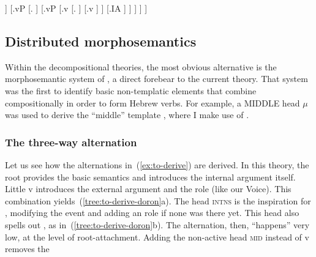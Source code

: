 \begin{exe}
\begin{xlist}
\begin{xlist}
\begin{exe}
\begin{xlist}
\begin{xlist}
\begin{exe}
\begin{xlist}
\begin{xlist}
\begin{exe}
\begin{exe}
\begin{xlist}
\begin{exe}
\begin{exe}
\begin{xlist}
\begin{exe}
\begin{exe}
\begin{exe}
\begin{exe}
\begin{exe}
\begin{xlist}
\begin{exe}
\begin{xlist}
\begin{exe}
\begin{exe}
\begin{xlist}
\begin{exe}
\begin{xlist}
\begin{exe}
\begin{xlist}
\begin{exe}
\begin{exe}
\begin{exe}
\begin{xlist}
\begin{exe}
\begin{exe}
\begin{exe}
\begin{xlist}
\begin{exe}
\begin{xlist}
\begin{exe}
\begin{xlist}
\begin{exe}
\begin{xlist}
\begin{exe}
\begin{exe}
\begin{exe}
\begin{exe}
\begin{xlist}
\begin{exe}
\begin{xlist}
\begin{exe}
\begin{xlist}
\begin{exe}
\begin{xlist}
\begin{exe}
\begin{xlist}
\begin{exe}
\begin{xlist}
\begin{exe}
\begin{exe}
\begin{exe}
\begin{exe}
\begin{xlist}
\begin{exe}
\begin{xlist}
\begin{exe}
\begin{xlist}
\begin{exe}
\begin{exe}
\begin{xlist}
\begin{exe}
\begin{xlist}
\begin{exe}
\begin{exe}
\begin{exe}
\begin{exe}
\begin{xlist}
\begin{xlist}
\begin{exe}
\begin{xlist}
\begin{exe}
\begin{exe}
\begin{exe}
\begin{xlist}
\begin{exe}
\begin{exe}
\begin{xlist}
\begin{exe}
\begin{exe}
\begin{exe}
\begin{xlist}
\begin{xlist}
\begin{exe}
\begin{xlist}
\begin{exe}
\begin{exe}
\begin{exe}
\begin{exe}
\begin{xlist}
\begin{exe}
\begin{xlist}
\begin{exe}
\begin{xlist}
\begin{exe}
\begin{xlist}
\begin{exe}
\begin{exe}
\begin{exe}
\begin{exe}
\begin{exe}
\begin{exe}
\begin{xlist}
\begin{exe}
\begin{xlist}
\begin{exe}
\begin{xlist}
\begin{exe}
\begin{xlist}
\begin{exe}
\begin{xlist}
\begin{exe}
\begin{xlist}
\begin{exe}
\begin{xlist}
]
						[.vP
							[.{\va} ]
							[.vP
								[.v
									[. ]
									[.v ]
								]
								[.IA ]
							]
						]
					]
				]			
 \z
\z 

	\subsection{Distributed morphosemantics \citep{doron03}} \label{vz:others:ed}
Within the decompositional theories, the most obvious alternative is the morphosemantic system of \cite{doron03}, a direct forebear to the current theory. That system was the first to identify basic non-templatic elements that combine compositionally in order to form Hebrew verbs. For example, a MIDDLE head $\mu$ was used to derive the ``middle'' template {\tnif}, where I make use of {\vz}.

		\subsubsection{The three-way alternation}
Let us see how the alternations in~(\ref{ex:to-derive}) are derived. In this theory, the root provides the basic semantics and introduces the internal argument itself. Little v introduces the external argument and the  role (like our Voice). This combination yields~(\ref{tree:to-derive-doron}a). The head \textsc{intns} is the inspiration for {\va}, modifying the event and adding an  role if none was there yet. This head also spells out {\tpie}, as in~(\ref{tree:to-derive-doron}b). The alternation, then, ``happens'' very low, at the level of root-attachment. Adding the non-active head \textsc{mid} instead of v removes the 
\end{xlist}
\end{exe}
\end{xlist}
\end{exe}
\end{xlist}
\end{exe}
\end{xlist}
\end{exe}
\end{xlist}
\end{exe}
\end{xlist}
\end{exe}
\end{xlist}
\end{exe}
\end{exe}
\end{exe}
\end{exe}
\end{exe}
\end{exe}
\end{xlist}
\end{exe}
\end{xlist}
\end{exe}
\end{xlist}
\end{exe}
\end{xlist}
\end{exe}
\end{exe}
\end{exe}
\end{exe}
\end{xlist}
\end{exe}
\end{xlist}
\end{xlist}
\end{exe}
\end{exe}
\end{exe}
\end{xlist}
\end{exe}
\end{exe}
\end{xlist}
\end{exe}
\end{exe}
\end{exe}
\end{xlist}
\end{exe}
\end{xlist}
\end{xlist}
\end{exe}
\end{exe}
\end{exe}
\end{exe}
\end{xlist}
\end{exe}
\end{xlist}
\end{exe}
\end{exe}
\end{xlist}
\end{exe}
\end{xlist}
\end{exe}
\end{xlist}
\end{exe}
\end{exe}
\end{exe}
\end{exe}
\end{xlist}
\end{exe}
\end{xlist}
\end{exe}
\end{xlist}
\end{exe}
\end{xlist}
\end{exe}
\end{xlist}
\end{exe}
\end{xlist}
\end{exe}
\end{exe}
\end{exe}
\end{exe}
\end{xlist}
\end{exe}
\end{xlist}
\end{exe}
\end{xlist}
\end{exe}
\end{xlist}
\end{exe}
\end{exe}
\end{exe}
\end{xlist}
\end{exe}
\end{exe}
\end{exe}
\end{xlist}
\end{exe}
\end{xlist}
\end{exe}
\end{xlist}
\end{exe}
\end{exe}
\end{xlist}
\end{exe}
\end{xlist}
\end{exe}
\end{exe}
\end{exe}
\end{exe}
\end{exe}
\end{xlist}
\end{exe}
\end{exe}
\end{xlist}
\end{exe}
\end{exe}
\end{xlist}
\end{xlist}
\end{exe}
\end{xlist}
\end{xlist}
\end{exe}
\end{xlist}
\end{xlist}
\end{exe}
